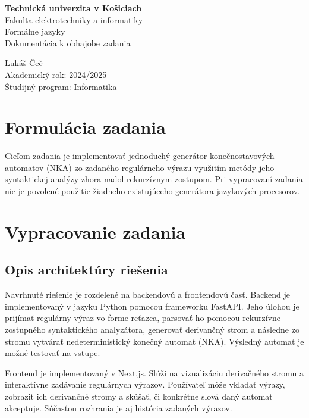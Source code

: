 \documentclass[a4paper,12pt]{article}
\begin{document}
\begin{titlepage}
    \centering
    \vspace*{1cm}
    \Large{\textbf{Technická univerzita v Košiciach}\\
    Fakulta elektrotechniky a informatiky}\\
    \vfill
    \large{Formálne jazyky}\\
    \large{Dokumentácia k obhajobe zadania}
    \vfill
    \begin{flushleft}
        Lukáš Čeč\\
        Akademický rok: 2024/2025\\
        Študijný program: Informatika
    \end{flushleft}
\end{titlepage}

\tableofcontents
\newpage

\section{Formulácia zadania}

Cieľom zadania je implementovať jednoduchý generátor konečnostavových automatov (NKA) zo zadaného regulárneho výrazu využitím metódy jeho syntaktickej analýzy zhora nadol rekurzívnym zostupom. Pri vypracovaní zadania nie je povolené použitie žiadneho existujúceho generátora jazykových procesorov.

\section{Vypracovanie zadania}

\subsection{Opis architektúry riešenia}

Navrhnuté riešenie je rozdelené na backendovú a frontendovú časť. Backend je implementovaný v jazyku Python pomocou frameworku FastAPI. Jeho úlohou je prijímať regulárny výraz vo forme reťazca, parsovať ho pomocou rekurzívne zostupného syntaktického analyzátora, generovať derivančný strom a následne zo stromu vytvárať nedeterministický konečný automat (NKA). Výsledný automat je možné testovať na vstupe.

Frontend je implementovaný v Next.js. Slúži na vizualizáciu derivačného stromu a interaktívne zadávanie regulárnych výrazov. Používateľ môže vkladať výrazy, zobraziť ich derivančné stromy a skúšať, či konkrétne slová daný automat akceptuje. Súčasťou rozhrania je aj história zadaných výrazov.
\end{document}
